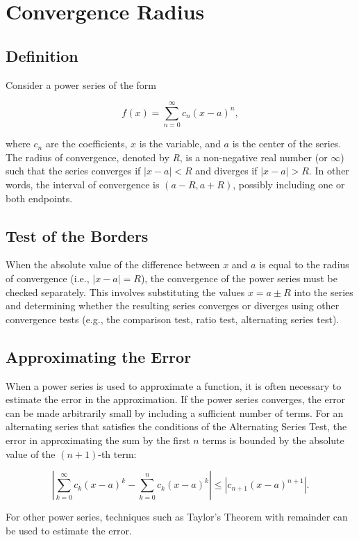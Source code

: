 \newpage
\section{Convergence Radius}

\subsection{Definition}

Consider a power series of the form

\[
    f(x) = \sum_{n=0}^{\infty} c_n {(x - a)}^n,
\]

where \(c_n\) are the coefficients, \(x\) is the variable, and \(a\) is the center of the series. The radius of convergence, denoted by \emph{R}, is a non-negative real number (or \(\infty\)) such that the series converges if \(|x - a| < R\) and diverges if \(|x - a| > R\). In other words, the interval of convergence is \((a - R, a + R)\), possibly including one or both endpoints.

\subsection{Test of the Borders}

When the absolute value of the difference between \(x\) and \(a\) is equal to the radius of convergence (i.e., \(|x - a| = R\)), the convergence of the power series must be checked separately. This involves substituting the values \(x = a \pm R\) into the series and determining whether the resulting series converges or diverges using other convergence tests (e.g., the comparison test, ratio test, alternating series test).

\subsection{Approximating the Error}

When a power series is used to approximate a function, it is often necessary to estimate the error in the approximation. If the power series converges, the error can be made arbitrarily small by including a sufficient number of terms. For an alternating series that satisfies the conditions of the Alternating Series Test, the error in approximating the sum by the first \(n\) terms is bounded by the absolute value of the \((n+1)\)-th term:

\[
    \left| \sum_{k=0}^{\infty} c_k {(x - a)}^k - \sum_{k=0}^{n} c_k {(x - a)}^k \right| \leq |c_{n+1} {(x - a)}^{n+1}|.
\]

For other power series, techniques such as Taylor's Theorem with remainder can be used to estimate the error.
